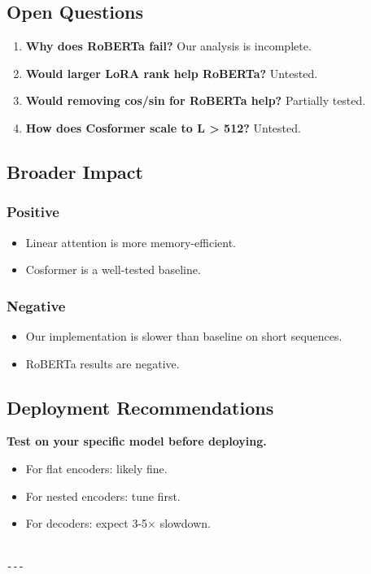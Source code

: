 \subsection{Open Questions}

\begin{enumerate}
\item \textbf{Why does RoBERTa fail?} Our analysis is incomplete.
\item \textbf{Would larger LoRA rank help RoBERTa?} Untested.
\item \textbf{Would removing cos/sin for RoBERTa help?} Partially tested.
\item \textbf{How does Cosformer scale to L > 512?} Untested.

\end{enumerate}
\subsection{Broader Impact}

\subsubsection{Positive}

\begin{itemize}
\item Linear attention is more memory-efficient.
\item Cosformer is a well-tested baseline.

\end{itemize}
\subsubsection{Negative}

\begin{itemize}
\item Our implementation is slower than baseline on short sequences.
\item RoBERTa results are negative.

\end{itemize}
\subsection{Deployment Recommendations}

\textbf{Test on your specific model before deploying.}
\begin{itemize}
\item For flat encoders: likely fine.
\item For nested encoders: tune first.
\item For decoders: expect 3-5$\times$ slowdown.
\end{itemize}
\begin{lstlisting}

---
\end{lstlisting}


